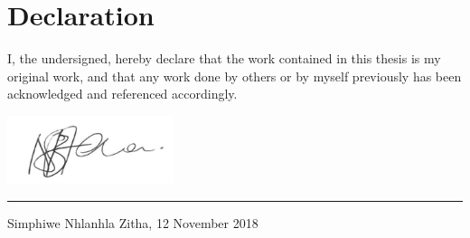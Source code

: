 \vfill
\newpage
\section*{Declaration}
I, the undersigned, hereby declare that the work contained in this thesis is my original work, and that any work done by others or by myself previously has been acknowledged and referenced accordingly.

\includegraphics[height=2cm]{images/Signature.png} \newline \hrule
Simphiwe Nhlanhla Zitha, 12 November 2018

